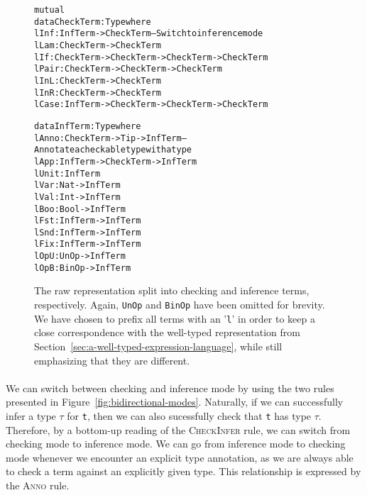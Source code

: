 \begin{figure}
\begin{alltt}
mutual
 data CheckTerm : Type where
   lInf  : InfTerm -> CheckTerm -- Switch to inference mode
   lLam  : CheckTerm -> CheckTerm
   lIf   : CheckTerm -> CheckTerm -> CheckTerm -> CheckTerm
   lPair : CheckTerm -> CheckTerm -> CheckTerm
   lInL  : CheckTerm -> CheckTerm
   lInR  : CheckTerm -> CheckTerm
   lCase : InfTerm -> CheckTerm -> CheckTerm -> CheckTerm
   
 data InfTerm : Type where
   lAnno : CheckTerm -> Tip -> InfTerm -- Annotate a checkable type with a type
   lApp  : InfTerm -> CheckTerm -> InfTerm
   lUnit : InfTerm
   lVar  : Nat -> InfTerm
   lVal  : Int -> InfTerm
   lBoo  : Bool -> InfTerm
   lFst  : InfTerm -> InfTerm
   lSnd  : InfTerm -> InfTerm
   lFix  : InfTerm -> InfTerm
   lOpU  : UnOp -> InfTerm
   lOpB  : BinOp -> InfTerm
\end{alltt}
\caption{The raw representation split into checking and inference terms, respectively. Again, \texttt{UnOp} and \texttt{BinOp} have been omitted for brevity. We have chosen to prefix all terms with an '\texttt{l}' in order to keep a close correspondence with the well-typed representation from Section~\ref{sec:a-well-typed-expression-language}, while still emphasizing that they are different.}
\label{fig:bidirectional-terms}
\end{figure}

\paragraph{}
We can switch between checking and inference mode by using the two rules presented in Figure~\ref{fig:bidirectional-modes}. Naturally, if we can successfully infer a type $\tau$ for \texttt{t}, then we can also sucessfully check that \texttt{t} has type $\tau$. Therefore, by a bottom-up reading of the \textsc{CheckInfer} rule, we can switch from checking mode to inference mode. We can go from inference mode to checking mode whenever we encounter an explicit type annotation, as we are always able to check a term against an explicitly given type. This relationship is expressed by the \textsc{Anno} rule.

